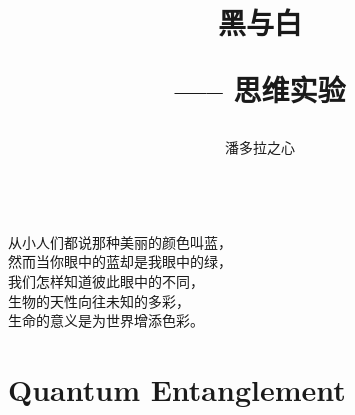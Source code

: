 \documentclass[10pt]{article}
\title{黑与白 \hspace{2pt}\hspace{2pt} \begin{large}----- \hspace{2pt} 思维实验 \end{large}}
\author{潘多拉之心}
\begin{document}
\maketitle

\begin{center}
\begin{spacing}{2.0}
\\
从小人们都说那种美丽的颜色叫蓝，\\
然而当你眼中的蓝却是我眼中的绿，\\
我们怎样知道彼此眼中的不同，\\
生物的天性向往未知的多彩，\\
生命的意义是为世界增添色彩。
\end{spacing}
\end{center}


\newpage
\section{Quantum Entanglement}
\end{document}
